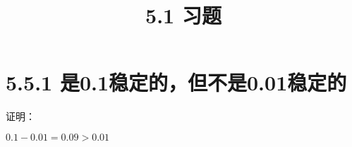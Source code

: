 \documentclass{article}
\theoremstyle{mystyle}
\begin{document}
\title{5.1 习题}
\maketitle


\section*{5.5.1 是0.1稳定的，但不是0.01稳定的} 

证明：

$0.1-0.01=0.09>0.01$
\end{document}
